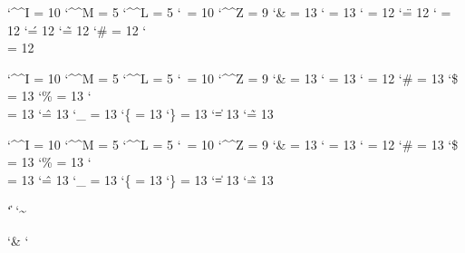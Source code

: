 \startcatcodetable \xmlcatcodesn
    \catcode`\^^I = 10 %
    \catcode`\^^M =  5 %
    \catcode`\^^L =  5 %
    \catcode`\    = 10 %
    \catcode`\^^Z =  9 %
    \catcode`\&   = 13 %
    \catcode`\<   = 13 %
    \catcode`\>   = 12
    \catcode`\"   = 12 %
    \catcode`\/   = 12 %
    \catcode`\'   = 12 %
    \catcode`\~   = 12 %
    \catcode`\#   = 12 %
    \catcode`\\   = 12 %
\stopcatcodetable

\startcatcodetable \xmlcatcodese
    \catcode`\^^I = 10 %
    \catcode`\^^M =  5 %
    \catcode`\^^L =  5 %
    \catcode`\    = 10 %
    \catcode`\^^Z =  9 %
    \catcode`\&   = 13 %
    \catcode`\<   = 13 %
    \catcode`\>   = 12
    \catcode`\#   = 13
    \catcode`\$   = 13
    \catcode`\%   = 13
    \catcode`\\   = 13
    \catcode`\^   = 13
    \catcode`\_   = 13
    \catcode`\{   = 13
    \catcode`\}   = 13
    \catcode`\|   = 13
    \catcode`\~   = 13
\stopcatcodetable

\startcatcodetable \xmlcatcodesr
    \catcode`\^^I = 10 %
    \catcode`\^^M =  5 %
    \catcode`\^^L =  5 %
    \catcode`\    = 10 %
    \catcode`\^^Z =  9 %
    \catcode`\&   = 13 %
    \catcode`\<   = 13 %
    \catcode`\>   = 12
    \catcode`\#   = 13
    \catcode`\$   = 13
    \catcode`\%   = 13
    \catcode`\\   = 13
    \catcode`\^   = 13
    \catcode`\_   = 13
    \catcode`\{   = 13
    \catcode`\}   = 13
    \catcode`\|   = 13
    \catcode`\~   = 13
\stopcatcodetable

 \ctxcatcodes  `\|   \relax
{} \ctxcatcodes  `\~   \relax


 \xmlcatcodesn `\&   \relax
{} \xmlcatcodesn `\<   \relax

